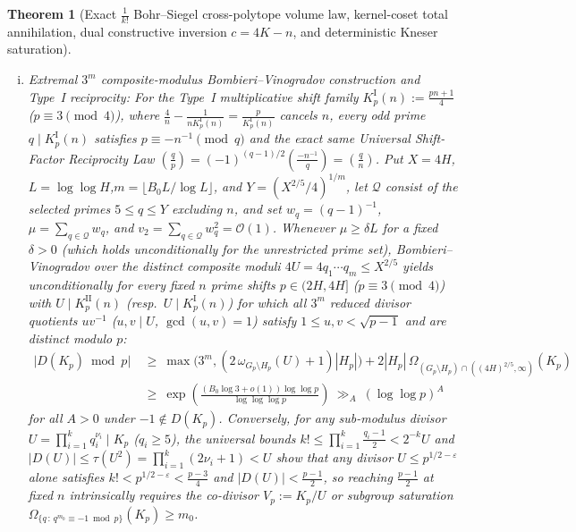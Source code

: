 \documentclass[11pt, a4paper]{article}
\theoremstyle{plain}
\newtheorem{theorem}{Theorem}[section]
\theoremstyle{definition}
\newcommand{\leg}[2]{\left(\frac{#1}{#2}\right)}
\begin{document}
\begin{theorem}[Exact $\frac{1}{k!}$ Bohr--Siegel cross-polytope volume law, kernel-coset total annihilation, dual constructive inversion $c=4K-n$, and deterministic Kneser saturation]
\begin{enumerate}[(a)]
\begin{enumerate}[(i)]
        \item \emph{Extremal $3^m$ composite-modulus Bombieri--Vinogradov construction and Type~I reciprocity:} For the Type~I multiplicative shift family $K_p^{\mathrm{I}}(n):=\frac{pn+1}{4}$ ($p\equiv3\pmod 4$), where $\frac{4}{n}-\frac{1}{nK_p^{\mathrm{I}}(n)}=\frac{p}{K_p^{\mathrm{I}}(n)}$ cancels $n$, every odd prime $q\mid K_p^{\mathrm{I}}(n)$ satisfies $p\equiv-n^{-1}\pmod q$ and the exact same Universal Shift-Factor Reciprocity Law $\leg{q}{p}=\allowbreak(-1)^{(q-1)/2}\allowbreak\leg{-n^{-1}}{q}=\allowbreak\leg{q}{n}$. Put $X=4H$, $L=\log\log H$,\linebreak $m=\lfloor B_0 L/\log L\rfloor$, and $Y=(X^{2/5}/4)^{1/m}$, let $\mathcal{Q}$ consist of the selected primes $5\le q\le Y$ excluding $n$, and set $w_q=(q-1)^{-1}$, $\mu=\sum_{q\in\mathcal{Q}}w_q$, and $v_2=\sum_{q\in\mathcal{Q}}w_q^{2}=\mathcal{O}(1)$. Whenever $\mu\ge\delta L$ for a fixed $\delta>0$ (which holds unconditionally for the unrestricted prime set), Bombieri--Vinogradov over the distinct composite moduli $4U=4q_1\cdots q_m\le X^{2/5}$ yields unconditionally for every fixed $n$ prime shifts $p\in(2H,4H]$ ($p\equiv3\pmod 4$) with $U\mid K_p^{\mathrm{II}}(n)$ (resp.\ $U\mid K_p^{\mathrm{I}}(n)$) for which all $3^{m}$ reduced divisor quotients $uv^{-1}$ ($u,v\mid U$, $\gcd(u,v)=1$) satisfy $1\le u,v<\sqrt{p-1}$ and are distinct modulo $p$:
        \begin{equation}\label{eq:extremal_composite_BV_3m_bound}
        \begin{split}
        \big|D(K_p)\bmod p\big|\ &\ge\ \max\!\big(3^{m},(2\,\omega_{G_p\setminus H_p}(U)+1)|H_p|\big)+2|H_p|\,\Omega_{(G_p\setminus H_p)\cap((4H)^{2/5},\infty)}(K_p)\\
        &\ge\ \exp\!\left(\frac{(B_0\log 3+o(1))\log\log p}{\log\log\log p}\right)\ \gg_A\ (\log\log p)^{A}
        \end{split}
        \end{equation}
        for all $A>0$ under $-1\notin D(K_p)$. Conversely, for any sub-modulus divisor $U=\prod_{i=1}^{k}q_i^{\nu_i}\mid K_p$ ($q_i\ge 5$), the universal bounds $k!\le\prod_{i=1}^{k}\frac{q_i-1}{2}<2^{-k}U$ and $|D(U)|\le\tau(U^{2})=\prod_{i=1}^{k}(2\nu_i+1)<U$ show that any divisor $U\le p^{1/2-\varepsilon}$ alone satisfies $k!<p^{1/2-\varepsilon}<\frac{p-3}{4}$ and $|D(U)|<\frac{p-1}{2}$, so reaching $\frac{p-1}{2}$ at fixed $n$ intrinsically requires the co-divisor $V_p:=K_p/U$ or subgroup saturation $\Omega_{\{q\,:\,q^{m_0}\equiv-1\bmod p\}}(K_p)\ge m_0$.


\end{enumerate}
\end{enumerate}
\end{theorem}
\end{document}
